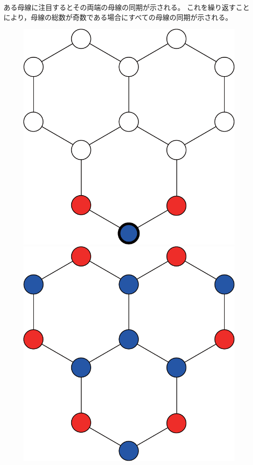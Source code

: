 \documentclass[tombow,dvipdfmx]{corona-a5-1.1}
\begin{document}
\begin{証明}
ある母線に注目するとその両端の母線の同期が示される。
これを繰り返すことにより，母線の総数が奇数である場合にすべての母線の同期が示される。
\end{証明}

\begin{figure}[t]
  \centering
  {
  \begin{minipage}{0.3\linewidth}
    \centering
    \includegraphics[width = .70\linewidth]{figs/honya}
    \subcaption{  }
  \end{minipage}
  \begin{minipage}{0.3\linewidth}
    \centering
    \includegraphics[width = .70\linewidth]{figs/honyb}
    \subcaption{  }
  \end{minipage}
  \begin{minipage}{0.3\linewidth}

\end{minipage}}
\end{figure}
\end{document}
